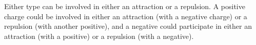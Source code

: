 Either type can be involved in either an attraction or a
repulsion. A positive charge could be involved in either an attraction (with a negative
charge) or a repulsion (with another positive), and a negative could participate
in either an attraction (with a positive) or a repulsion (with a negative).



